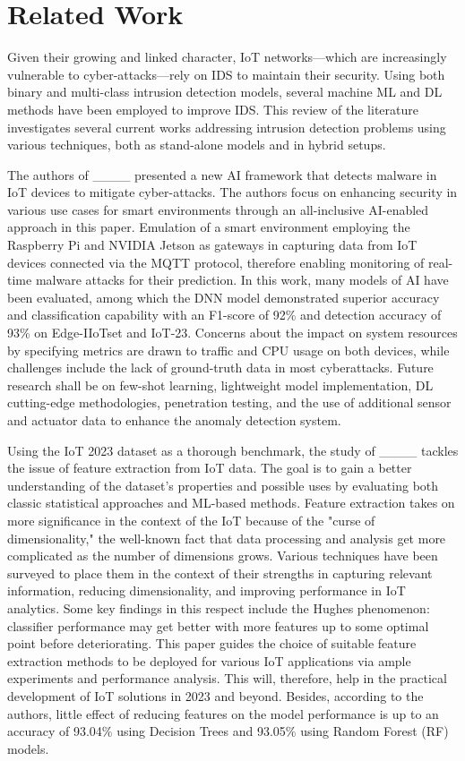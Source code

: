 \section{Related Work}
\label{sec:Section2}
Given their growing and linked character, IoT networks—which are increasingly vulnerable to cyber-attacks—rely on IDS to maintain their security. Using both binary and multi-class intrusion detection models, several machine ML and DL methods have been employed to improve IDS. This review of the literature investigates several current works addressing intrusion detection problems using various techniques, both as stand-alone models and in hybrid setups.

The authors of ____ presented a new AI framework that detects malware in IoT devices to mitigate cyber-attacks. The authors focus on enhancing security in various use cases for smart environments through an all-inclusive AI-enabled approach in this paper. Emulation of a smart environment employing the Raspberry Pi and NVIDIA Jetson as gateways in capturing data from IoT devices connected via the MQTT protocol, therefore enabling monitoring of real-time malware attacks for their prediction. In this work, many models of AI have been evaluated, among which the DNN model demonstrated superior accuracy and classification capability with an F1-score of 92\% and detection accuracy of 93\% on Edge-IIoTset and IoT-23. Concerns about the impact on system resources by specifying metrics are drawn to traffic and CPU usage on both devices, while challenges include the lack of ground-truth data in most cyberattacks. Future research shall 
be on few-shot learning, lightweight model implementation, DL cutting-edge methodologies, penetration testing, and the use of additional sensor and actuator data to enhance the anomaly detection system.

Using the IoT 2023 dataset as a thorough benchmark, the study of ____ tackles the issue of feature extraction from IoT data. The goal is to gain a better understanding of the dataset's properties and possible uses by evaluating both classic statistical approaches and ML-based methods. Feature extraction takes on more significance in the context of the IoT because of the "curse of dimensionality," the well-known fact that data processing and analysis get more complicated as the number of dimensions grows. Various techniques have been surveyed to place them in the context of their strengths in capturing relevant information, reducing dimensionality, and improving performance in IoT analytics. Some key findings in this respect include the Hughes phenomenon: classifier performance may get better with more features up to some optimal point before deteriorating. This paper guides the choice of suitable feature extraction methods to be deployed for various IoT applications via ample experiments and performance analysis. This will, therefore, help in the practical development of IoT solutions in 2023 and beyond. Besides, according to the authors, little effect of reducing features on the model performance is up to an accuracy of 93.04\% using Decision Trees and 93.05\% using Random Forest (RF) models. 

